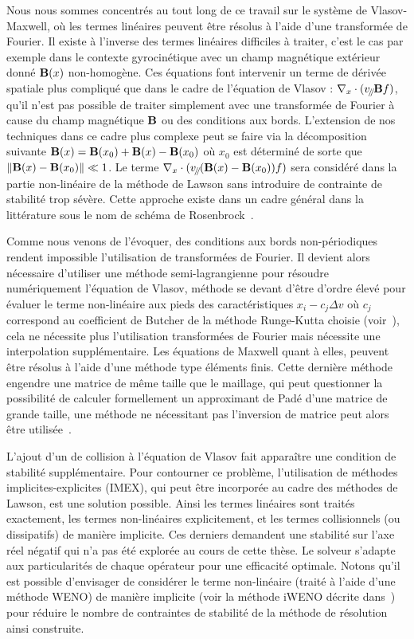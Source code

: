 Nous nous sommes concentrés au tout long de ce travail sur le système de Vlasov-Maxwell, où les termes linéaires peuvent être résolus à l'aide d'une transformée de Fourier. Il existe à l'inverse des termes linéaires difficiles à traiter, c'est le cas par exemple dans le contexte gyrocinétique avec un champ magnétique extérieur donné $\vb{B}(x)$ non-homogène. Ces équations font intervenir un terme de dérivée spatiale plus compliqué que dans le cadre de l'équation de Vlasov : $\nabla_{x}\cdot(v_{\mathbin{\!/\mkern-5mu/\!}}\vb{B}f)$, qu'il n'est pas possible de traiter simplement avec une transformée de Fourier à cause du champ magnétique $\vb{B}$ ou des conditions aux bords. L'extension de nos techniques dans ce cadre plus complexe peut se faire via la décomposition suivante $\vb{B}(x)=\vb{B}(x_0)+\vb{B}(x)-\vb{B}(x_0)$ où $x_0$ est déterminé de sorte que $\|\vb{B}(x)-\vb{B}(x_0)\| \ll 1$. Le terme $\nabla_x\cdot (v_{\mathbin{\!/\mkern-5mu/\!}} (\vb{B}(x)-\vb{B}(x_0))f)$ sera considéré dans la partie non-linéaire de la méthode de Lawson sans introduire de contrainte de stabilité trop sévère. Cette approche existe dans un cadre général dans la littérature sous le nom de schéma de Rosenbrock~\cite{Hochbruck:2006,Hochbruck:2009,Luan:2016}.


Comme nous venons de l'évoquer, des conditions aux bords non-périodiques rendent impossible l'utilisation de transformées de Fourier. Il devient alors nécessaire d'utiliser une méthode semi-lagrangienne pour résoudre numériquement l'équation de Vlasov, méthode se devant d'être d'ordre élevé pour évaluer le terme non-linéaire aux pieds des caractéristiques $x_i - c_j\Delta v$ où $c_j$ correspond au coefficient de Butcher de la méthode Runge-Kutta choisie (voir~\cite{Boscarino:2019a}), cela ne nécessite plus l'utilisation transformées de Fourier mais nécessite une interpolation supplémentaire. Les équations de Maxwell quant à elles, peuvent être résolus à l'aide d'une méthode type éléments finis. Cette dernière méthode engendre une matrice de même taille que le maillage, qui peut questionner la possibilité de calculer formellement un approximant de Padé d'une matrice de grande taille, une méthode ne nécessitant pas l'inversion de matrice peut alors être utilisée~\cite{Li:2011}.

L'ajout d'un de collision à l'équation de Vlasov fait apparaître une condition de stabilité supplémentaire. Pour contourner ce problème, l'utilisation de méthodes implicites-explicites (IMEX), qui peut être incorporée au cadre des méthodes de Lawson, est une solution possible. Ainsi les termes linéaires sont traités exactement, les termes non-linéaires explicitement, et les termes collisionnels (ou dissipatifs) de manière implicite. Ces derniers demandent une stabilité sur l'axe réel négatif qui n'a pas été explorée au cours de cette thèse. Le solveur s'adapte aux particularités de chaque opérateur pour une efficacité optimale. Notons qu'il est possible d'envisager de considérer le terme non-linéaire (traité à l'aide d'une méthode WENO) de manière implicite (voir la méthode iWENO décrite dans~\cite{Gottlieb:2006}) pour réduire le nombre de contraintes de stabilité de la méthode de résolution ainsi construite.

